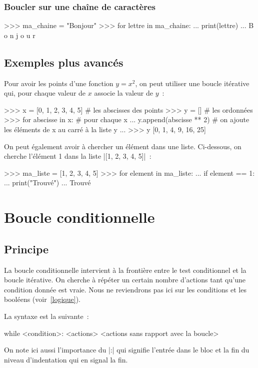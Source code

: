 		\subsubsection{Boucler sur une chaîne de caractères}
		\begin{pythoncode}
			>>> ma_chaine = "Bonjour"
			>>> for lettre in ma_chaine:
			... 	print(lettre)
			...
			B
			o
			n
			j
			o
			u
			r
		\end{pythoncode}
	
	\subsection{Exemples plus avancés}
		
		Pour avoir les points d'une fonction $y = x^2$, on peut utiliser une boucle itérative qui, pour chaque valeur de $x$ associe la valeur de $y$~:
		\begin{pythoncode}
			>>> x = [0, 1, 2, 3, 4, 5] # les abscisses des points
			>>> y = [] # les ordonnées
			>>> for abscisse in x: # pour chaque x
			... 	y.append(abscisse ** 2) # on ajoute les éléments de x au carré à la liste y
			...
			>>> y
			[0, 1, 4, 9, 16, 25]
		\end{pythoncode}
		
		On peut également avoir à chercher un élément dans une liste. Ci-dessous, on cherche l'élément 1 dans la liste \python|[1, 2, 3, 4, 5]|~:
		\begin{pythoncode}
			>>> ma_liste = [1, 2, 3, 4, 5]
			>>> for element in ma_liste:
			... 	if element == 1:
			... 		print("Trouvé")
			...
			Trouvé
		\end{pythoncode}

\section{Boucle conditionnelle}
	
	\subsection{Principe}
	
		La boucle conditionnelle intervient à la frontière entre le test conditionnel et la boucle itérative.
		On cherche à répéter un certain nombre d'actions tant qu'une condition donnée est vraie. Nous ne reviendrons pas ici sur les conditions et les booléens (voir~\ref{logique}).
		
		La syntaxe est la suivante~:
		\begin{pythoncode}
			while <condition>:
				<actions>
			<actions sans rapport avec la boucle>
		\end{pythoncode}
		On note ici aussi l'importance du \python|:| qui signifie l'entrée dans le bloc et la fin du niveau d'indentation qui en signal la fin.
	
